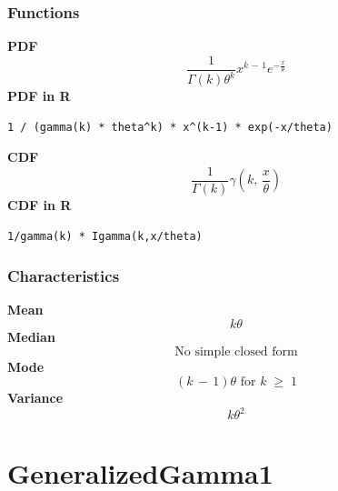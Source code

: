 \subsubsection*{Functions}

\smallskip \noindent \hspace{.2cm} \textbf{PDF} 
\begin{equation*}\frac{1}{\Gamma(k) \theta^k} x^{k \,-\, 1} e^{-\frac{x}{\theta}}\end{equation*}
\smallskip \noindent \hspace{.2cm} \textbf{PDF in R}  
\begin{verbatim}1 / (gamma(k) * theta^k) * x^(k-1) * exp(-x/theta)\end{verbatim}
\smallskip \noindent \hspace{.2cm} \textbf{CDF} 
\begin{equation*}\frac{1}{\Gamma(k)} \gamma\left(k,\, \frac{x}{\theta}\right)\end{equation*}
\smallskip \noindent \hspace{.2cm} \textbf{CDF in R} 
\begin{verbatim}1/gamma(k) * Igamma(k,x/theta)\end{verbatim}
\smallskip
\subsubsection*{Characteristics}
\smallskip \noindent \hspace{.2cm} \textbf{Mean} 
\begin{equation*}k \theta\end{equation*}
\smallskip \noindent \hspace{.2cm} \textbf{Median} 
\begin{equation*}\text{No simple closed form}\end{equation*}
\smallskip \noindent \hspace{.2cm} \textbf{Mode} 
\begin{equation*}(k \,-\, 1)\theta \text{ for } k \;{\geq}\; 1\end{equation*}
\smallskip \noindent \hspace{.2cm} \textbf{Variance} 
\begin{equation*}k \theta^2\end{equation*}
\smallskip
\section*{GeneralizedGamma1} 

